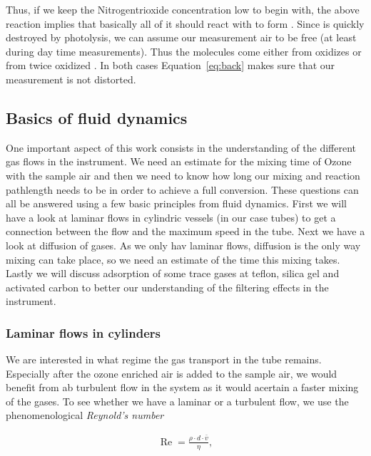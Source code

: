Thus, if we keep the Nitrogentrioxide concentration low to begin with,
the above reaction implies that basically all of it should react with
 to form . Since  is quickly destroyed by
photolysis, we can assume our measurement air to be  free (at
least during day time measurements). Thus the molecules come either
from oxidizes  or from twice oxidized . In both cases
Equation~\eqref{eq:back} makes sure that our measurement is not distorted.


\subsection{Basics of fluid dynamics}
\label{sec:fluid}

One important aspect of this work consists in the understanding of the
different gas flows in the instrument. We need an estimate for the
mixing time of Ozone with the sample air and then we need to know how
long our mixing and reaction pathlength needs to be in order to
achieve a full conversion. These questions can all be answered using a
few basic principles from fluid dynamics. First we will have a look at
laminar flows in cylindric vessels (in our case tubes) to get a
connection between the flow and the maximum speed in the tube. Next we
have a look at diffusion of gases. As we only hav laminar flows,
diffusion is the only way mixing can take place, so we need an
estimate of the time this mixing takes. Lastly we will discuss
adsorption of some trace gases at teflon, silica gel and activated
carbon to better our understanding of the filtering effects in the
instrument. 

\subsubsection{Laminar flows in cylinders}
\label{sec:cylinder}

We are interested in what regime the gas transport in the tube
remains. Especially after the ozone enriched air is added to the
sample air, we would benefit from ab turbulent flow in the system as
it would acertain a faster mixing of the gases. To see whether we have
a laminar or a turbulent flow, we use the phenomenological \emph{Reynold's
number}

\begin{align*}
  \operatorname{Re} = \frac{\rho \cdot d \cdot \bar v}{\eta},
\end{align*}

